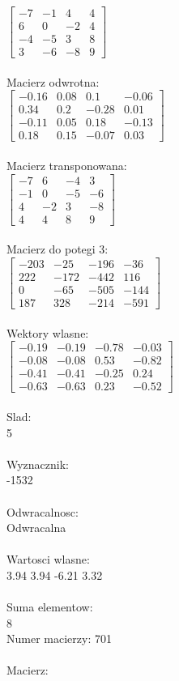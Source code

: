 \documentclass[a4paper,12pt]{article}
\begin{document}
$\begin{bmatrix} -7&-1&4&4\\6&0&-2&4\\-4&-5&3&8\\3&-6&-8&9 \end{bmatrix}$
\\
\\
Macierz odwrotna:\\

$\begin{bmatrix} -0.16&0.08&0.1&-0.06\\0.34&0.2&-0.28&0.01\\-0.11&0.05&0.18&-0.13\\0.18&0.15&-0.07&0.03 \end{bmatrix}$
\\
\\
Macierz transponowana:\\

$\begin{bmatrix} -7&6&-4&3\\-1&0&-5&-6\\4&-2&3&-8\\4&4&8&9 \end{bmatrix}$
\\
\\
Macierz do potegi 3:\\

$\begin{bmatrix} -203&-25&-196&-36\\222&-172&-442&116\\0&-65&-505&-144\\187&328&-214&-591 \end{bmatrix}$
\\
\\
Wektory wlasne:\\

$\begin{bmatrix} -0.19&-0.19&-0.78&-0.03\\-0.08&-0.08&0.53&-0.82\\-0.41&-0.41&-0.25&0.24\\-0.63&-0.63&0.23&-0.52 \end{bmatrix}$
\\
\\
Slad:\\
5
\\
\\
Wyznacznik:\\
-1532
\\
\\
Odwracalnosc:\\
Odwracalna
\\
\\
Wartosci wlasne:\\
3.94 3.94 -6.21 3.32
\\
\\
Suma elementow:\\
8
\\
\newpage
Numer macierzy:
701
\\
\\
Macierz:\\
\end{document}
